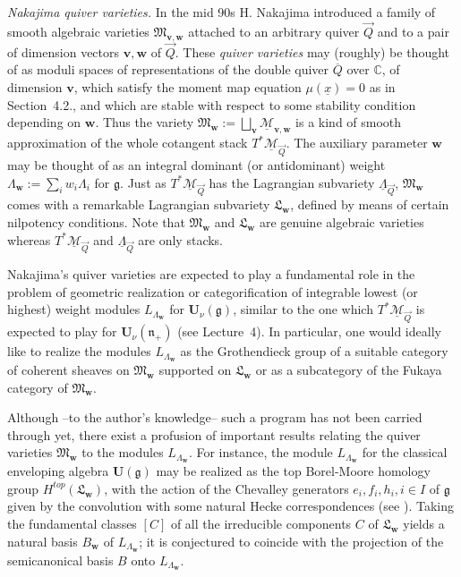 \documentclass[a4paper,10pt]{amsart}
\def\U{\mathbf{U}}
\def\g{\mathfrak{g}}
\def\n{\mathfrak{n}}
\numberwithin{equation}{section}
\begin{document}
\noindent
\textit{Nakajima quiver varieties.} In the mid 90s H. Nakajima introduced a family of smooth algebraic varieties $\mathfrak{M}_{\mathbf{v},\mathbf{w}}$ attached to an arbitrary quiver $\vec{Q}$ and to a pair of dimension vectors $\mathbf{v}, \mathbf{w}$ of $\vec{Q}$. These \textit{quiver varieties} may (roughly) be thought of as moduli spaces of representations of the double quiver $\overline{Q}$ over $\mathbb{C}$, of dimension $\mathbf{v}$, which satisfy the moment map equation $\mu(\underline{x})=0$ as in Section~4.2., and which are stable with respect to some stability condition depending on $\mathbf{w}$. Thus the variety $\mathfrak{M}_{\mathbf{w}}:=\bigsqcup_{\mathbf{v}} \underline{\mathcal{M}}_{\mathbf{v},\mathbf{w}}$ is a kind of smooth approximation of the whole cotangent stack $T^*\underline{\mathcal{M}}_{\vec{Q}}$. The auxiliary parameter $\mathbf{w}$ may be thought of as an integral  dominant (or antidominant) weight $\Lambda_\mathbf{w}:=\sum_i w_i \Lambda_i$ for $\g$.
 Just as $T^*\underline{\mathcal{M}}_{\vec{Q}}$ has the Lagrangian subvariety $\underline{\Lambda}_{\vec{Q}}$, $\mathfrak{M}_{\mathbf{w}}$ comes with a remarkable Lagrangian subvariety $\mathfrak{L}_{\mathbf{w}}$, defined by means of certain nilpotency conditions. Note that $\mathfrak{M}_{\mathbf{w}}$ and $\mathfrak{L}_{\mathbf{w}}$ are genuine algebraic varieties whereas $T^*\underline{\mathcal{M}}_{\vec{Q}}$ and $\underline{\Lambda}_{\vec{Q}}$ are only stacks.

Nakajima's quiver varieties are expected to play a fundamental role in the problem of geometric realization or categorification of integrable lowest (or highest) weight modules $L_{\Lambda_{\mathbf{w}}}$ for $\U_\nu(\g)$, similar to the one which $T^*\underline{\mathcal{M}}_{\vec{Q}}$ is expected to play for $\U_{\nu}(\n_+)$ (see Lecture~4). In particular, one would ideally like to realize the modules $L_{\Lambda_{\mathbf{w}}}$ as the Grothendieck group of a suitable category of coherent sheaves on $\mathfrak{M}_{\mathbf{w}}$ supported on $\mathfrak{L}_{\mathbf{w}}$ or as a subcategory of the Fukaya category of $\mathfrak{M}_{\mathbf{w}}$.

Although --to the author's knowledge-- such a program has not been carried through yet, there exist a profusion of important results relating the quiver varieties $\mathfrak{M}_{\mathbf{w}}$ to the modules $L_{\Lambda_{\mathbf{w}}}$. For instance, the module $L_{\Lambda_\mathbf{w}}$ for the classical enveloping algebra $\U(\g)$ may be realized as the top Borel-Moore homology group $H^{top}(\mathfrak{L}_{\mathbf{w}})$, with the action of the Chevalley generators $e_i, f_i, h_i, i \in I$ of $\g$ given by the convolution with some natural Hecke correspondences (see \cite{Nak1}). Taking the fundamental classes $[C]$ of all the irreducible components $C$ of $\mathfrak{L}_{\mathbf{w}}$ yields a natural basis $B_{\mathbf{w}}$ of $L_{\Lambda_\mathbf{w}}$; it is conjectured to coincide with the projection of the semicanonical basis $B$ onto $L_{\Lambda_{\mathbf{w}}}$.
  
\end{document}
